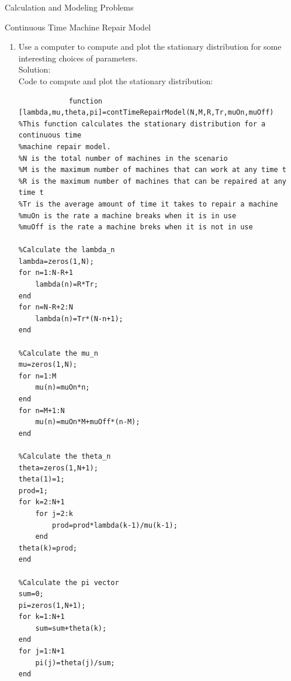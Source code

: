 \documentclass[12pt]{article}
\numberwithin{equation}{section}
\begin{document}
\begin{section}{Calculation and Modeling Problems}
\begin{subsection}{Continuous Time Machine Repair Model}
\begin{enumerate}
        \item Use a computer to compute and plot the stationary distribution for some interesting choices of parameters.\\

            Solution:\\

            Code to compute and plot the stationary distribution:
            \begin{lstlisting}
            function [lambda,mu,theta,pi]=contTimeRepairModel(N,M,R,Tr,muOn,muOff)
%This function calculates the stationary distribution for a continuous time
%machine repair model.
%N is the total number of machines in the scenario
%M is the maximum number of machines that can work at any time t
%R is the maximum number of machines that can be repaired at any time t
%Tr is the average amount of time it takes to repair a machine
%muOn is the rate a machine breaks when it is in use
%muOff is the rate a machine breks when it is not in use

%Calculate the lambda_n
lambda=zeros(1,N);
for n=1:N-R+1
    lambda(n)=R*Tr;
end
for n=N-R+2:N
    lambda(n)=Tr*(N-n+1);
end

%Calculate the mu_n
mu=zeros(1,N);
for n=1:M
    mu(n)=muOn*n;
end
for n=M+1:N
    mu(n)=muOn*M+muOff*(n-M);
end

%Calculate the theta_n
theta=zeros(1,N+1);
theta(1)=1;
prod=1;
for k=2:N+1
    for j=2:k
        prod=prod*lambda(k-1)/mu(k-1);
    end
theta(k)=prod;
end

%Calculate the pi vector
sum=0;
pi=zeros(1,N+1);
for k=1:N+1
    sum=sum+theta(k);
end
for j=1:N+1
    pi(j)=theta(j)/sum;
end


\end{lstlisting}
\end{enumerate}
\end{subsection}
\end{section}
\end{document}
